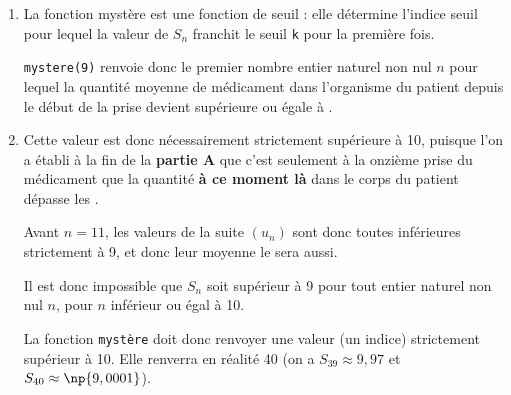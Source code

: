 \begin{enumerate}
	\item La fonction mystère est une fonction de seuil : elle détermine l'indice seuil pour lequel la valeur de $S_n$ franchit le seuil \texttt{k} pour la première fois.

	\texttt{mystere(9)} renvoie donc le premier nombre entier naturel non nul $n$ pour lequel la quantité moyenne de médicament dans l'organisme du patient depuis le début de la prise devient supérieure ou égale à .

	\item Cette valeur est donc nécessairement strictement supérieure à 10, puisque l'on a établi à la fin de la \textbf{partie A} que c'est seulement à la onzième prise du médicament que la quantité \textbf{à ce moment là} dans le corps du patient dépasse les .

Avant $n = 11$, les valeurs de la suite $(u_n)$ sont donc toutes inférieures strictement à 9, et donc leur moyenne le sera aussi.

Il est donc impossible que $S_n$ soit supérieur à 9 pour tout entier naturel non nul $n$, pour $n$ inférieur ou égal à 10.

La fonction \texttt{mystère} doit donc renvoyer une valeur (un indice) strictement supérieur à 10. Elle renverra en réalité 40 (on a $S_{39} \approx 9,97$ et $S_{40} \approx \np{9,0001}$).
\end{enumerate}

\medskip
